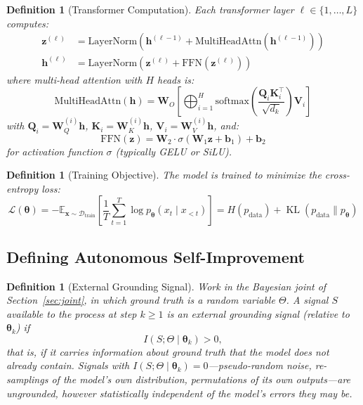 \documentclass[11pt,a4paper]{article}
\newtheorem{definition}[theorem]{Definition}
\DeclareMathOperator{\KL}{KL}
\begin{document}
\begin{definition}[Transformer Computation]
Each transformer layer $\ell \in \{1, \ldots, L\}$ computes:
\begin{align}
\bm{z}^{(\ell)} &= \mathrm{LayerNorm}\!\left(\bm{h}^{(\ell-1)} + \mathrm{MultiHeadAttn}(\bm{h}^{(\ell-1)})\right) \\
\bm{h}^{(\ell)} &= \mathrm{LayerNorm}\!\left(\bm{z}^{(\ell)} + \mathrm{FFN}(\bm{z}^{(\ell)})\right)
\end{align}
where multi-head attention with $H$ heads is:
\begin{equation}
\mathrm{MultiHeadAttn}(\bm{h}) = \bm{W}_O \!\left[\bigoplus_{i=1}^{H} \mathrm{softmax}\!\left(\frac{\bm{Q}_i \bm{K}_i^\top}{\sqrt{d_k}}\right) \bm{V}_i \right]
\end{equation}
with $\bm{Q}_i = \bm{W}_Q^{(i)} \bm{h}$, $\bm{K}_i = \bm{W}_K^{(i)} \bm{h}$, $\bm{V}_i = \bm{W}_V^{(i)} \bm{h}$, and:
\begin{equation}
\mathrm{FFN}(\bm{z}) = \bm{W}_2 \cdot \sigma(\bm{W}_1 \bm{z} + \bm{b}_1) + \bm{b}_2
\end{equation}
for activation function $\sigma$ (typically GELU or SiLU).
\end{definition}

\begin{definition}[Training Objective]
The model is trained to minimize the cross-entropy loss:
\begin{equation}
\mathcal{L}(\bm{\theta}) = -\mathbb{E}_{\bm{x} \sim \mathcal{D}_{\mathrm{train}}}\!\left[\frac{1}{T}\sum_{t=1}^{T} \log p_{\bm{\theta}}(x_t \mid x_{<t})\right] = H(p_{\mathrm{data}}) + \KL(p_{\mathrm{data}} \| p_{\bm{\theta}})
\label{eq:loss}
\end{equation}
\end{definition}

\subsection{Defining Autonomous Self-Improvement}

\begin{definition}[External Grounding Signal]
\label{def:grounding}
Work in the Bayesian joint of Section~\ref{sec:joint}, in which ground truth is a random variable $\Theta$. A signal $S$ available to the process at step $k \geq 1$ is an \emph{external grounding signal} (relative to $\bm{\theta}_k$) if
\begin{equation}
I(S; \Theta \mid \bm{\theta}_k) > 0,
\end{equation}
that is, if it carries information about ground truth that the model does not already contain. Signals with $I(S; \Theta \mid \bm{\theta}_k) = 0$---pseudo-random noise, re-samplings of the model's own distribution, permutations of its own outputs---are \emph{ungrounded}, however statistically independent of the model's errors they may be.
\end{definition}
\end{document}
